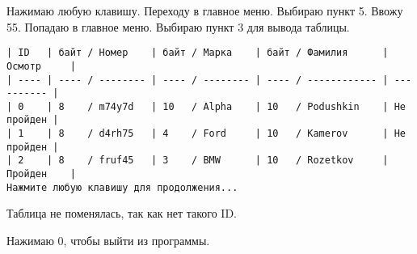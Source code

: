 Нажимаю любую клавишу. Переходу в главное меню. Выбираю пункт 5. Ввожу 55. Попадаю в главное меню. Выбираю пункт 3 для вывода таблицы.

\begin{tcolorbox}
\begin{verbatim}
| ID   | байт / Номер    | байт / Марка    | байт / Фамилия      | Осмотр     |
| ---- | ---- / -------- | ---- / -------- | ---- / ------------ | ---------- |
| 0    | 8    / m74y7d   | 10   / Alpha    | 10   / Podushkin    | Не пройден |
| 1    | 8    / d4rh75   | 4    / Ford     | 10   / Kamerov      | Не пройден |
| 2    | 8    / fruf45   | 3    / BMW      | 10   / Rozetkov     | Пройден    |
Нажмите любую клавишу для продолжения...
\end{verbatim}
\end{tcolorbox}

Таблица не поменялась, так как нет такого ID.

Нажимаю 0, чтобы выйти из программы.